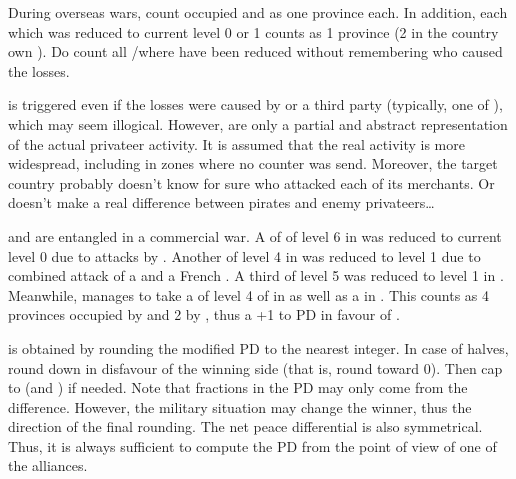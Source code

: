 \label{chPeace:Privateer Effect}
\bparag During overseas wars, count occupied \COL and \TP as one province
each.
 In addition, each \TradeFLEET\Faceplus which was
reduced to current level 0 or 1 counts as 1 province (2 in the country own
\CTZ).
\bparag Do count all \CTZ/\STZ where \TradeFLEET have been reduced without
remembering who caused the losses.

\begin{designnote}
  is triggered even if the losses were caused by  or a third
  party \corsaire (typically, one of \Barbaresques), which may seem
  illogical. However, \corsaire are only a partial and abstract representation
  of the actual privateer activity. It is assumed that the real activity is
  more widespread, including in zones where no counter was send. Moreover, the
  target country probably doesn't know for sure who attacked each of its
  merchants. Or doesn't make a real difference between pirates and enemy
  privateers\ldots
\end{designnote}

\begin{exemple}
  \FRA and \ANG are entangled in a commercial war. A \TradeFLEET of \ANG of
  level 6 in  was reduced to current level 0 due to attacks by
  \leaderBart. Another \TradeFLEET of level 4 in  was
  reduced to level 1 due to combined attack of a  \corsaire and
  a French \corsaire. A third \TradeFLEET of level 5 was reduced to level 1 in
  . Meanwhile, \ANG manages to take a \COL of level 4 of \FRA in
  \granderegionQuebec as well as a \TP in \continentIndia. This counts as 4
  provinces occupied by \FRA and 2 by \ANG, thus a +1 to PD in favour of \FRA.
\end{exemple}

 is obtained by rounding the modified PD to
the nearest integer. In case of halves, round down in disfavour of the winning
side (that is, round toward 0). Then cap to  (and ) if
needed.
\bparag Note that fractions in the PD may only come from the \STAB
difference. However, the military situation may change the winner, thus the
direction of the final rounding.
\bparag The net peace differential is also symmetrical. Thus, it is always
sufficient to compute the PD from the point of view of one of the alliances.

